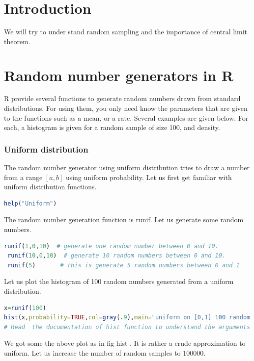 \documentclass["../Applied_probabillity _and_statistics_lab_KTU.tex"]{subfiles}
\begin{document}
  \section{Introduction}
   We will try to under stand random sampling and the importance of central limit theorem.
   
   
   \section{Random number generators in R}
    R  provide several functions to generate random numbers  drawn from  standard distributions.  For using  them, you only need  know the parameters that are given to the functions such as a mean, or a rate. Several examples  are given below. For each, a histogram is given for a random sample of size 100, and density.
     \subsubsection{Uniform distribution}
     The  random number generator using uniform distribution  tries  to draw a number from a range $[a,b]$ using uniform probability.  Let us first get familiar with uniform distribution functions.
\begin{lstlisting}[language=R]
 help("Uniform")
\end{lstlisting}
   The random number generation function is runif.  Let us  generate some random numbers.
   
   \begin{lstlisting}[language=R]
 runif(1,0,10)  # generate one random number between 0 and 10.
 runif(10,0,10)  # generate 10 random numbers between 0 and 10.
 runif(5)       # this is generate 5 random numbers between 0 and 1

\end{lstlisting}

Let us plot the histogram of  100 random numbers generated from a uniform distribution.

      \begin{lstlisting}[language=R]
x=runif(100)  
hist(x,probability=TRUE,col=gray(.9),main="uniform on [0,1] 100 random numbers"
# Read  the documentation of hist function to understand the arguments 
\end{lstlisting}

We got some the above plot as in fig hist . It is  rather a crude approximation  to uniform. Let us increase the number of random samples to 100000. 
\end{document}
